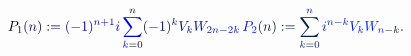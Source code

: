 \documentclass[12pt]{article}
\begin{document}
\makeatletter
\renewcommand*{\@textcolor}[3]{%
  \protect\leavevmode
  \begingroup
    \color#1{#2}#3%
  \endgroup
}
\makeatother
\begin{displaymath}
\mathcolor[RGB]{0,0,15}{P} _ { \mathcolor[RGB]{0,0,30}{1} } \mathcolor[RGB]{0,0,45}{(} \mathcolor[RGB]{0,0,60}{n} \mathcolor[RGB]{0,0,75}{)} \mathcolor[RGB]{0,0,90}{:} \mathcolor[RGB]{0,0,105}{=} \mathcolor[RGB]{0,0,120}{(} \mathcolor[RGB]{0,0,135}{-} \mathcolor[RGB]{0,0,150}{1} \mathcolor[RGB]{0,0,165}{)} ^ { \mathcolor[RGB]{0,0,180}{n} \mathcolor[RGB]{0,0,195}{+} \mathcolor[RGB]{0,0,210}{1} } \mathcolor[RGB]{0,0,225}{i} \mathcolor[RGB]{0,0,240}{\sum} _ { \mathcolor[RGB]{0,0,255}{k} \mathcolor[RGB]{0,15,0}{=} \mathcolor[RGB]{0,15,15}{0} } ^ { \mathcolor[RGB]{0,15,30}{n} } \mathcolor[RGB]{0,15,45}{(} \mathcolor[RGB]{0,15,60}{-} \mathcolor[RGB]{0,15,75}{1} \mathcolor[RGB]{0,15,90}{)} ^ { \mathcolor[RGB]{0,15,105}{k} } \mathcolor[RGB]{0,15,120}{V} _ { \mathcolor[RGB]{0,15,135}{k} } \mathcolor[RGB]{0,15,150}{W} _ { \mathcolor[RGB]{0,15,165}{2} \mathcolor[RGB]{0,15,180}{n} \mathcolor[RGB]{0,15,195}{-} \mathcolor[RGB]{0,15,210}{2} \mathcolor[RGB]{0,15,225}{k} } \mathcolor[RGB]{0,15,240}{\,
P} _ { \mathcolor[RGB]{0,15,255}{2} } \mathcolor[RGB]{0,30,0}{(} \mathcolor[RGB]{0,30,15}{n} \mathcolor[RGB]{0,30,30}{)} \mathcolor[RGB]{0,30,45}{:} \mathcolor[RGB]{0,30,60}{=} \mathcolor[RGB]{0,30,75}{\sum} _ { \mathcolor[RGB]{0,30,90}{k} \mathcolor[RGB]{0,30,105}{=} \mathcolor[RGB]{0,30,120}{0} } ^ { \mathcolor[RGB]{0,30,135}{n} } \mathcolor[RGB]{0,30,150}{i} ^ { \mathcolor[RGB]{0,30,165}{n} \mathcolor[RGB]{0,30,180}{-} \mathcolor[RGB]{0,30,195}{k} } \mathcolor[RGB]{0,30,210}{V} _ { \mathcolor[RGB]{0,30,225}{k} } \mathcolor[RGB]{0,30,240}{W} _ { \mathcolor[RGB]{0,30,255}{n} \mathcolor[RGB]{0,45,0}{-} \mathcolor[RGB]{0,45,15}{k} } \mathcolor[RGB]{0,45,30}{.}
\end{displaymath}
\end{document}
